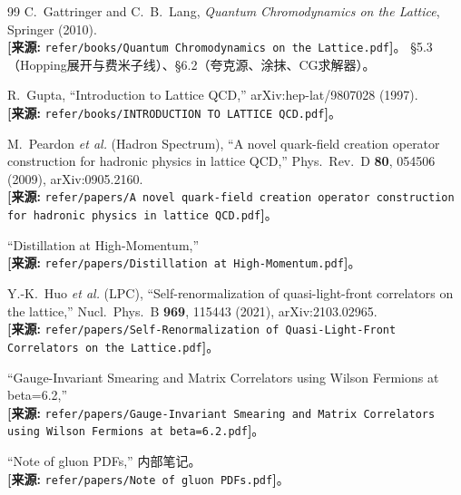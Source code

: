 \documentclass[12pt,a4paper]{ctexart}
\theoremstyle{definition}
\begin{document}
\begin{thebibliography}{99}
C.~Gattringer and C.~B.~Lang,
\textit{Quantum Chromodynamics on the Lattice}, Springer (2010).
\\\textbf{[来源:} \texttt{refer/books/Quantum Chromodynamics on the Lattice.pdf}\textbf{]}。
§5.3（Hopping展开与费米子线）、§6.2（夸克源、涂抹、CG求解器）。

R.~Gupta, ``Introduction to Lattice QCD,'' arXiv:hep-lat/9807028 (1997).
\\\textbf{[来源:} \texttt{refer/books/INTRODUCTION TO LATTICE QCD.pdf}\textbf{]}。

M.~Peardon \textit{et al.} (Hadron Spectrum),
``A novel quark-field creation operator construction for hadronic physics in lattice QCD,''
Phys.\ Rev.\ D \textbf{80}, 054506 (2009), arXiv:0905.2160.
\\\textbf{[来源:} \texttt{refer/papers/A novel quark-field creation operator construction for hadronic physics in lattice QCD.pdf}\textbf{]}。

``Distillation at High-Momentum,''
\\\textbf{[来源:} \texttt{refer/papers/Distillation at High-Momentum.pdf}\textbf{]}。

Y.-K.~Huo \textit{et al.} (LPC),
``Self-renormalization of quasi-light-front correlators on the lattice,''
Nucl.\ Phys.\ B \textbf{969}, 115443 (2021), arXiv:2103.02965.
\\\textbf{[来源:} \texttt{refer/papers/Self-Renormalization of Quasi-Light-Front Correlators on the Lattice.pdf}\textbf{]}。

``Gauge-Invariant Smearing and Matrix Correlators using Wilson Fermions at beta=6.2,''
\\\textbf{[来源:} \texttt{refer/papers/Gauge-Invariant Smearing and Matrix Correlators using Wilson Fermions at beta=6.2.pdf}\textbf{]}。

``Note of gluon PDFs,'' 内部笔记。
\\\textbf{[来源:} \texttt{refer/papers/Note of gluon PDFs.pdf}\textbf{]}。
\end{thebibliography}
\end{document}
